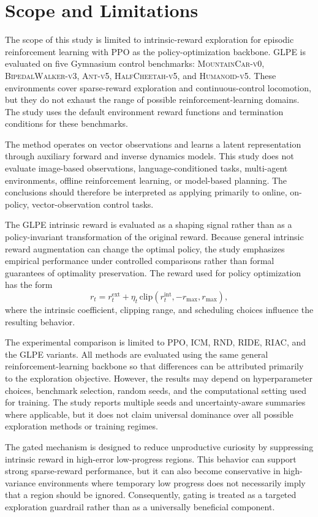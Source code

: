 \section{Scope and Limitations}
\label{sec:scope_and_limitations}

The scope of this study is limited to intrinsic-reward exploration for episodic reinforcement learning with PPO as the policy-optimization backbone.
GLPE is evaluated on five Gymnasium control benchmarks: \textsc{MountainCar-v0}, \textsc{BipedalWalker-v3}, \textsc{Ant-v5}, \textsc{HalfCheetah-v5}, and \textsc{Humanoid-v5}.
These environments cover sparse-reward exploration and continuous-control locomotion, but they do not exhaust the range of possible reinforcement-learning domains.
The study uses the default environment reward functions and termination conditions for these benchmarks.

The method operates on vector observations and learns a latent representation through auxiliary forward and inverse dynamics models.
This study does not evaluate image-based observations, language-conditioned tasks, multi-agent environments, offline reinforcement learning, or model-based planning.
The conclusions should therefore be interpreted as applying primarily to online, on-policy, vector-observation control tasks.

The GLPE intrinsic reward is evaluated as a shaping signal rather than as a policy-invariant transformation of the original reward.
Because general intrinsic reward augmentation can change the optimal policy, the study emphasizes empirical performance under controlled comparisons rather than formal guarantees of optimality preservation.
The reward used for policy optimization has the form
\begin{equation}
    r_t = r_t^{\mathrm{ext}} + \eta_t\,\mathrm{clip}(r_t^{\mathrm{int}}, -r_{\max}, r_{\max}),
\end{equation}
where the intrinsic coefficient, clipping range, and scheduling choices influence the resulting behavior.

The experimental comparison is limited to PPO, ICM, RND, RIDE, RIAC, and the GLPE variants.
All methods are evaluated using the same general reinforcement-learning backbone so that differences can be attributed primarily to the exploration objective.
However, the results may depend on hyperparameter choices, benchmark selection, random seeds, and the computational setting used for training.
The study reports multiple seeds and uncertainty-aware summaries where applicable, but it does not claim universal dominance over all possible exploration methods or training regimes.

The gated mechanism is designed to reduce unproductive curiosity by suppressing intrinsic reward in high-error low-progress regions.
This behavior can support strong sparse-reward performance, but it can also become conservative in high-variance environments where temporary low progress does not necessarily imply that a region should be ignored.
Consequently, gating is treated as a targeted exploration guardrail rather than as a universally beneficial component.